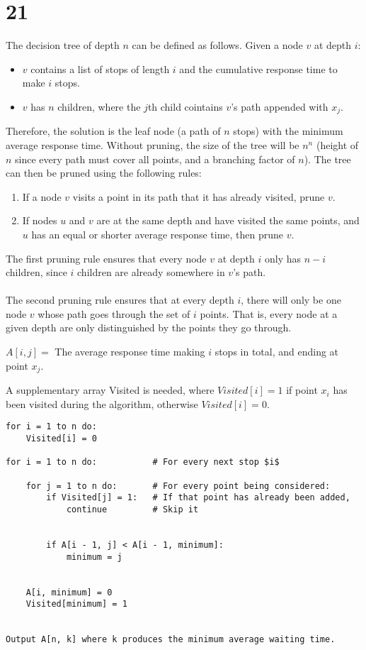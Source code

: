 \documentclass[letterpaper,notitlepage,twoside]{article}
\begin{document}
\section*{21}
The decision tree of depth $n$ can be defined as follows. Given a node $v$ at depth $i$: 
\begin{itemize}
\item $v$ contains a list of stops of length $i$ and the cumulative response time to make $i$ stops. 
\item $v$ has $n$ children, where the $j$th child cointains $v$'s path appended with $x_j$.
\end{itemize}
Therefore, the solution is the leaf node (a path of $n$ stops) with the minimum average response time. Without pruning, the size of the tree will be $n^n$ (height of $n$ since every path must cover all points, and a branching factor of $n$). The tree can then be pruned using the following rules:
\begin{enumerate}
\item If a node $v$ visits a point in its path that it has already visited, prune $v$.
\item If nodes $u$ and $v$ are at the same depth and have visited the same points, and $u$ has an equal or shorter average response time, then prune $v$.
\end{enumerate}

The first pruning rule ensures that every node $v$ at depth $i$ only has $n - i$ children, since $i$ children are already somewhere in $v$'s path.
\\\\
The second pruning rule ensures that at every depth $i$, there will only be one node $v$ whose path goes through the set of $i$ points. That is, every node at a given depth are only distinguished by the points they go through.

$A[i, j] =$ The average response time making $i$ stops in total, and ending at point $x_j$.

A supplementary array Visited is needed, where $Visited[i] = 1$ if point $x_i$ has been visited during the algorithm, otherwise $Visited[i] = 0$.

\begin{verbatim}
for i = 1 to n do:
    Visited[i] = 0

for i = 1 to n do:           # For every next stop $i$
    
    for j = 1 to n do:       # For every point being considered:
        if Visited[j] = 1:   # If that point has already been added,
            continue         # Skip it


        if A[i - 1, j] < A[i - 1, minimum]:
            minimum = j


    A[i, minimum] = 0
    Visited[minimum] = 1


Output A[n, k] where k produces the minimum average waiting time. 

\end{verbatim}
\end{document}

